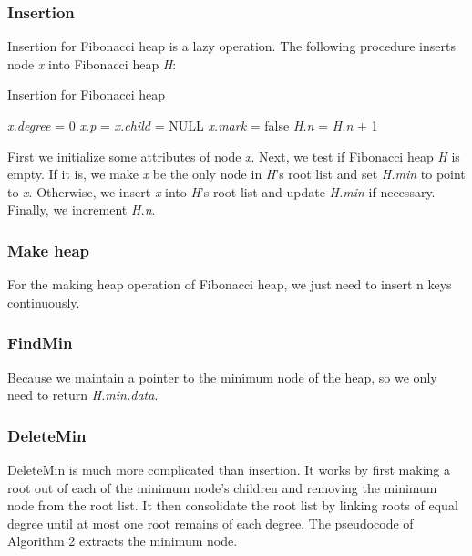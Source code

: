 \documentclass[12pt]{article}
\begin{document}
    \subsubsection{Insertion}
    Insertion for Fibonacci heap is a lazy operation. The following procedure inserts node \emph{x} into Fibonacci heap \emph{H}:
    \begin{algorithm}
        \caption{Insertion for Fibonacci heap}
        \LinesNumbered
        \emph{x.degree} = 0\;
        \emph{x.p} = \emph{x.child} = NULL\;
        \emph{x.mark} = false\;
        \emph{H.n} = \emph{H.n} + 1
    \end{algorithm}

    First we initialize some attributes of node \emph{x}. Next, we test if Fibonacci heap \emph{H} is empty. 
    If it is, we make \emph{x} be the only node in \emph{H}’s root list and set \emph{H.min} to point to \emph{x}. 
    Otherwise, we insert \emph{x} into \emph{H}’s root list and update \emph{H.min} if necessary. Finally, we increment \emph{H.n}.

    \subsubsection{Make heap}
    For the making heap operation of Fibonacci heap, we just need 
    to insert n keys continuously.

    \subsubsection{FindMin}
    Because we maintain a pointer to the minimum node of the heap, 
    so we only need to return \emph{H.min.data}.
    \subsubsection{DeleteMin}
    DeleteMin is much more complicated than insertion. It works by first making a root
    out of each of the minimum node’s children and removing the minimum node from
    the root list. It then consolidate the root list by linking roots of equal degree until
    at most one root remains of each degree. The pseudocode of Algorithm 2 extracts the minimum node.
    
\end{document}
